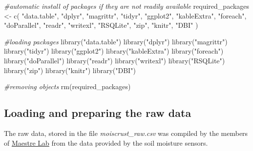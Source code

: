 \documentclass[
  table]{article}
\newenvironment{Shaded}{\begin{snugshade}}{\end{snugshade}}
\newcommand{\CommentTok}[1]{\textcolor[rgb]{0.56,0.35,0.01}{\textit{#1}}}
\newcommand{\FunctionTok}[1]{\textcolor[rgb]{0.00,0.00,0.00}{#1}}
\newcommand{\NormalTok}[1]{#1}
\newcommand{\OtherTok}[1]{\textcolor[rgb]{0.56,0.35,0.01}{#1}}
\newcommand{\StringTok}[1]{\textcolor[rgb]{0.31,0.60,0.02}{#1}}
\begin{document}
\begin{Shaded}
\begin{Highlighting}[]
\CommentTok{\#automatic install of packages if they are not readily available}
\NormalTok{required\_packages }\OtherTok{\textless{}{-}} \FunctionTok{c}\NormalTok{(}
  \StringTok{"data.table"}\NormalTok{,}
  \StringTok{"dplyr"}\NormalTok{,}
  \StringTok{"magrittr"}\NormalTok{,}
  \StringTok{"tidyr"}\NormalTok{,}
  \StringTok{"ggplot2"}\NormalTok{,}
  \StringTok{"kableExtra"}\NormalTok{,}
  \StringTok{"foreach"}\NormalTok{,}
  \StringTok{"doParallel"}\NormalTok{,}
  \StringTok{"readr"}\NormalTok{,}
  \StringTok{"writexl"}\NormalTok{,}
  \StringTok{"RSQLite"}\NormalTok{,}
  \StringTok{"zip"}\NormalTok{,}
  \StringTok{"knitr"}\NormalTok{,}
  \StringTok{"DBI"}
\NormalTok{)}

\CommentTok{\#loading packages}
\FunctionTok{library}\NormalTok{(}\StringTok{"data.table"}\NormalTok{)}
\FunctionTok{library}\NormalTok{(}\StringTok{"dplyr"}\NormalTok{)}
\FunctionTok{library}\NormalTok{(}\StringTok{"magrittr"}\NormalTok{)}
\FunctionTok{library}\NormalTok{(}\StringTok{"tidyr"}\NormalTok{)}
\FunctionTok{library}\NormalTok{(}\StringTok{"ggplot2"}\NormalTok{)}
\FunctionTok{library}\NormalTok{(}\StringTok{"kableExtra"}\NormalTok{)}
\FunctionTok{library}\NormalTok{(}\StringTok{"foreach"}\NormalTok{)}
\FunctionTok{library}\NormalTok{(}\StringTok{"doParallel"}\NormalTok{)}
\FunctionTok{library}\NormalTok{(}\StringTok{"readr"}\NormalTok{)}
\FunctionTok{library}\NormalTok{(}\StringTok{"writexl"}\NormalTok{)}
\FunctionTok{library}\NormalTok{(}\StringTok{"RSQLite"}\NormalTok{)}
\FunctionTok{library}\NormalTok{(}\StringTok{"zip"}\NormalTok{)}
\FunctionTok{library}\NormalTok{(}\StringTok{"knitr"}\NormalTok{)}
\FunctionTok{library}\NormalTok{(}\StringTok{"DBI"}\NormalTok{)}

\CommentTok{\#removing objects}
\FunctionTok{rm}\NormalTok{(required\_packages)}
\end{Highlighting}
\end{Shaded}

\hypertarget{loading-and-preparing-the-raw-data}{%
\subsection{Loading and preparing the raw
data}\label{loading-and-preparing-the-raw-data}}

The raw data, stored in the file \emph{moiscrust\_raw.csv} was compiled
by the members of \href{https://maestrelab.com/en/}{Maestre Lab} from
the data provided by the soil moisture sensors.
\end{document}
